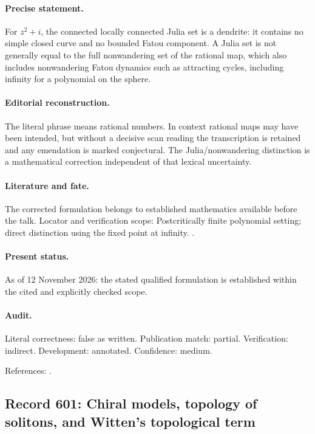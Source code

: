 \paragraph{Precise statement.} For \(z^2+i\), the connected locally connected Julia set is a dendrite: it contains no simple closed curve and no bounded Fatou component. A Julia set is not generally equal to the full nonwandering set of the rational map, which also includes nonwandering Fatou dynamics such as attracting cycles, including infinity for a polynomial on the sphere.

\paragraph{Editorial reconstruction.} The literal phrase  means rational numbers. In context rational maps may have been intended, but without a decisive scan reading the transcription is retained and any emendation is marked conjectural. The Julia/nonwandering distinction is a mathematical correction independent of that lexical uncertainty.

\paragraph{Literature and fate.} The corrected formulation belongs to established mathematics available before the talk. Locator and verification scope: Postcritically finite polynomial setting; direct distinction using the fixed point at infinity. \cite{douadyhubbard1985polynomes}.

\paragraph{Present status.} As of 12 November 2026: the stated qualified formulation is established within the cited and explicitly checked scope.

\paragraph{Audit.} Literal correctness: false as written. Publication match: partial. Verification: indirect. Development: annotated. Confidence: medium.

\noindent References: \citep{douadyhubbard1985polynomes}.\par

\subsection{Record 601: Chiral models, topology of solitons, and Witten's topological term}

